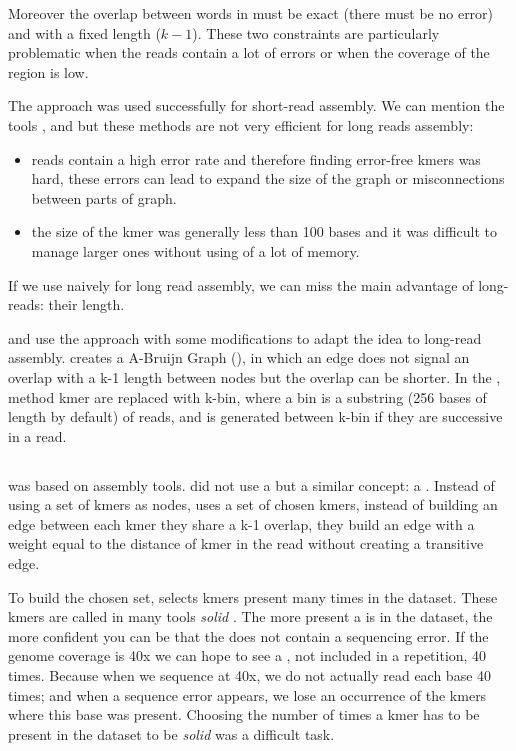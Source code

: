 \documentclass[main]{subfiles}
\begin{document}
Moreover the overlap between words in \DBG must be exact (there must be no error) and with a fixed length ($k - 1$). These two constraints are particularly problematic when the reads contain a lot of errors or when the coverage of the region is low.

The \DBG approach was used successfully for short-read assembly. We can mention the tools  \cite{spades},  \cite{minia} and \cite{megahit} but these methods are not very efficient for long reads assembly:
\begin{itemize}
    \item reads contain a high error rate and therefore finding error-free kmers was hard, these errors can lead to expand the size of the graph or misconnections between parts of graph.
    \item the size of the kmer was generally less than 100 bases and it was difficult to manage larger ones without using of a lot of memory.
\end{itemize}

If we use \DBG naively for long read assembly, we can miss the main advantage of long-reads: their length.

\flye and \wtdbg use the \DBG approach with some modifications to adapt the idea to long-read assembly. \flye creates a A-Bruijn Graph (), in which an edge does not signal an overlap with a k-1 length between nodes but the overlap can be shorter. In the \wtdbg, method kmer are replaced with k-bin, where a bin is a substring (256 bases of length by default) of reads, and is generated between k-bin if they are successive in a read.

\subsection{\flye}

\flye\cite{Flye} was based on \abruijn\cite{abruijn} assembly tools. \abruijn did not use a \DBG but a similar concept: a . Instead of using a set of kmers as nodes,  uses a set of chosen kmers, instead of building an edge between each kmer they share a k-1 overlap, they build an edge with a weight equal to the distance of kmer in the read without creating a transitive edge.

To build the chosen \kmers set, \abruijn selects kmers present many times in the dataset. These kmers are called in many tools \textit{solid} \kmers {} . The more present a \kmer is in the dataset, the more confident you can be that the \kmer does not contain a sequencing error. If the genome coverage is 40x we can hope to see a \kmer, not included in a repetition, 40 times. Because when we sequence at 40x, we do not actually read each base 40 times; and when a sequence error appears, we lose an occurrence of the kmers where this base was present. Choosing the number of times a kmer has to be present in the dataset to be \textit{solid} was a difficult task.
\end{document}
